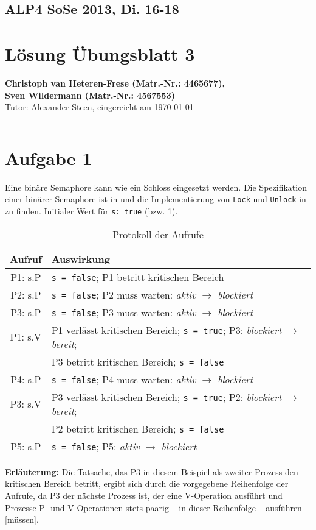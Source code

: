 \documentclass[11pt,a4paper,DIV=10,]{scrartcl}
\begin{document}
\onecolumn
\subsection*{ALP4 SoSe 2013, Di. 16-18}
\section*{Lösung Übungsblatt 3}
\textbf{Christoph van Heteren-Frese (Matr.-Nr.: 4465677), \\ Sven Wildermann (Matr.-Nr.: 4567553)}\\
Tutor: Alexander Steen, eingereicht am \today\\
\hrule
\section*{Aufgabe 1}
Eine binäre Semaphore kann wie ein Schloss eingesetzt werden.
Die Spezifikation einer binärer Semaphore ist in \citep[S. 54]{Maurer.2012} und die Implementierung von \texttt{Lock} und \texttt{Unlock} in \citep[S. 55]{Maurer.2012} zu finden. 
Initialer Wert für \texttt{s: true} (bzw. 1).
\begin{table}[H]
\centering
\begin{tabular}{c|l}
\hline 
Aufruf & Auswirkung \\ 
\hline 
P1: s.P & \texttt{s = false}; P1 betritt kritischen Bereich\\
P2: s.P & \texttt{s = false}; P2 muss warten: \textit{aktiv} $\rightarrow$ \textit{blockiert}\\
P3: s.P & \texttt{s = false}; P3 muss warten:  \textit{aktiv} $\rightarrow$ \textit{blockiert} \\
P1: s.V & P1 verlässt kritischen Bereich; \texttt{s = true}; P3: \textit{blockiert} $\rightarrow$ \textit{bereit}; \\ &   P3 betritt kritischen Bereich; \texttt{s = false}\\ 
P4: s.P &\texttt{s = false}; P4 muss warten: \textit{aktiv} $\rightarrow$ \textit{blockiert} \\
P3: s.V & P3 verlässt kritischen Bereich; \texttt{s = true}; P2: \textit{blockiert} $\rightarrow$
\textit{bereit}; \\ &   P2 betritt kritischen Bereich; \texttt{s = false}\\ 
P5: s.P & \texttt{s = false}; P5: \textit{aktiv} $\rightarrow$ \textit{blockiert} \\
\hline 
\end{tabular} 
\caption{Protokoll der Aufrufe}
\end{table}
\textbf{Erläuterung:} Die Tatsache, das P3 in diesem Beispiel als zweiter Prozess den kritischen Bereich betritt, ergibt sich durch die vorgegebene Reihenfolge der Aufrufe, da P3 der nächste Prozess ist, der eine V-Operation ausführt und
\glqq[...] Prozesse P- und V-Operationen stets paarig -- in dieser Reihenfolge -- ausführen [müssen]\cite[vgl.][S. 55]{Maurer.2012}.\grqq
\end{document}
